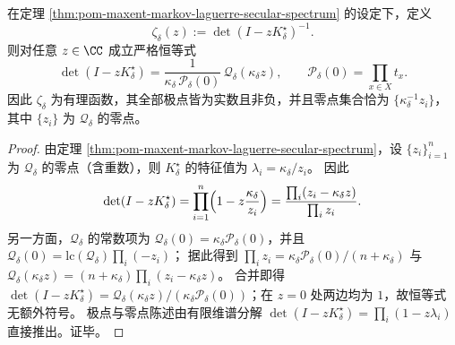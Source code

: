 \begin{corollary}\label{cor:pom-maxent-markov-zeta-determinant-single-polynomial}
在定理 \ref{thm:pom-maxent-markov-laguerre-secular-spectrum} 的设定下，定义
\[
\zeta_\delta(z):=\det(I-zK^\star_\delta)^{-1}.
\]
则对任意 \(z\in\CC\) 成立严格恒等式
\[
\det(I-zK^\star_\delta)=\frac{1}{\kappa_\delta\,\mathcal P_\delta(0)}\,\mathcal Q_\delta(\kappa_\delta z),
\qquad
\mathcal P_\delta(0)=\prod_{x\in X}t_x.
\]
因此 \(\zeta_\delta\) 为有理函数，其全部极点皆为实数且非负，并且零点集合恰为 \(\{\kappa_\delta^{-1}z_i\}\)，其中 \(\{z_i\}\) 为 \(\mathcal Q_\delta\) 的零点。
\end{corollary}
\begin{proof}
由定理 \ref{thm:pom-maxent-markov-laguerre-secular-spectrum}，设 \(\{z_i\}_{i=1}^n\) 为 \(\mathcal Q_\delta\) 的零点（含重数），则 \(K^\star_\delta\) 的特征值为 \(\lambda_i=\kappa_\delta/z_i\)。
因此
\[
\det(I-zK^\star_\delta)=\prod_{i=1}^n\Bigl(1-z\frac{\kappa_\delta}{z_i}\Bigr)=\frac{\prod_i(z_i-\kappa_\delta z)}{\prod_i z_i}.
\]
另一方面，\(\mathcal Q_\delta\) 的常数项为 \(\mathcal Q_\delta(0)=\kappa_\delta\mathcal P_\delta(0)\)，并且 \(\mathcal Q_\delta(0)=\mathrm{lc}(\mathcal Q_\delta)\prod_i(-z_i)\)；
据此得到 \(\prod_i z_i=\kappa_\delta\mathcal P_\delta(0)/(n+\kappa_\delta)\) 与
\(
\mathcal Q_\delta(\kappa_\delta z)=(n+\kappa_\delta)\prod_i(z_i-\kappa_\delta z)
\)。
合并即得 \(\det(I-zK^\star_\delta)=\mathcal Q_\delta(\kappa_\delta z)/(\kappa_\delta\mathcal P_\delta(0))\)；在 \(z=0\) 处两边均为 \(1\)，故恒等式无额外符号。
极点与零点陈述由有限维谱分解 \(\det(I-zK^\star_\delta)=\prod_i(1-z\lambda_i)\) 直接推出。证毕。
\end{proof}



